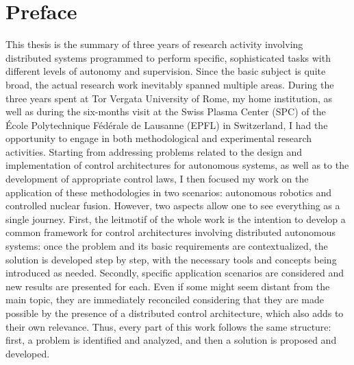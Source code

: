 \chapter*{Preface}

This thesis is the summary of three years of research activity involving distributed systems programmed to perform specific, sophisticated tasks with different levels of autonomy and supervision. Since the basic subject is quite broad, the actual research work inevitably spanned multiple areas. During the three years spent at Tor Vergata University of Rome, my home institution, as well as during the six-months visit at the Swiss Plasma Center (SPC) of the École Polytechnique Fédérale de Lausanne (EPFL) in Switzerland, I had the opportunity to engage in both methodological and experimental research activities. Starting from addressing problems related to the design and implementation of control architectures for autonomous systems, as well as to the development of appropriate control laws, I then focused my work on the application of these methodologies in two scenarios: autonomous robotics and controlled nuclear fusion. However, two aspects allow one to see everything as a single journey. First, the leitmotif of the whole work is the intention to develop a common framework for control architectures involving distributed autonomous systems: once the problem and its basic requirements are contextualized, the solution is developed step by step, with the necessary tools and concepts being introduced as needed. Secondly, specific application scenarios are considered and new results are presented for each. Even if some might seem distant from the main topic, they are immediately reconciled considering that they are made possible by the presence of a distributed control architecture, which also adds to their own relevance. Thus, every part of this work follows the same structure: first, a problem is identified and analyzed, and then a solution is proposed and developed.




